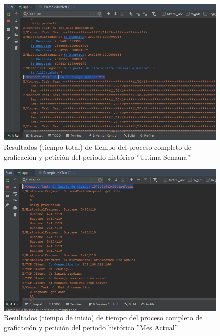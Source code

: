 \begin{figure}[H]
	\centering
	\includegraphics[scale=.6]{Capitulo5/images/TiempoCompletoUltimaSemana2.png}
	\caption{Resultados (tiempo total) de tiempo del proceso completo de graficación y petición del periodo histórico ''Ultima Semana''}	\label{fig:TiempoCompletoHUltimaSemana2}
\end{figure} 
\begin{figure}[H]
	\centering
	\includegraphics[scale=.6]{Capitulo5/images/TiempoCompletoMesActual.png}
	\caption{Resultados (tiempo de inicio) de tiempo del proceso completo de graficación y petición del periodo histórico ''Mes Actual''}	\label{fig:TiempoCompletoHMesActual}
\end{figure} 
